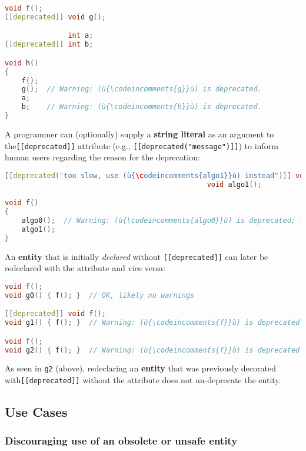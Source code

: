\begin{lstlisting}[language=C++]
               void f();
[[deprecated]] void g();

               int a;
[[deprecated]] int b;

void h()
{
    f();
    g();  // Warning: (ù{\codeincomments{g}}ù) is deprecated.
    a;
    b;    // Warning: (ù{\codeincomments{b}}ù) is deprecated.
}
\end{lstlisting}
    
\noindent A programmer can (optionally) supply a \textbf{string literal} as an
argument to the\linebreak[4] \mbox{\texttt{[[deprecated]]}} attribute (e.g.,
\mbox{\texttt{[[deprecated("message")]]}}) to inform human users regarding the
reason for the deprecation:

\begin{lstlisting}[language=C++]
[[deprecated("too slow, use (ù{\codeincomments{algo1}}ù) instead")]] void algo0();
                                                void algo1();

void f()
{
    algo0();  // Warning: (ù{\codeincomments{algo0}}ù) is deprecated; too slow, use (ù{\codeincomments{algo1}}ù) instead.
    algo1();
}
\end{lstlisting}
    
\noindent An \textbf{entity} that is initially \emph{declared} without
\texttt{[[deprecated]]} can later be redeclared with the attribute and
vice versa:

\begin{lstlisting}[language=C++]
void f();
void g0() { f(); }  // OK, likely no warnings

[[deprecated]] void f();
void g1() { f(); }  // Warning: (ù{\codeincomments{f}}ù) is deprecated.

void f();
void g2() { f(); }  // Warning: (ù{\codeincomments{f}}ù) is deprecated (still).
\end{lstlisting}
    
\noindent As seen in \texttt{g2} (above), redeclaring an \textbf{entity} that was
previously decorated with\linebreak[4] \mbox{\texttt{[[deprecated]]}} without the attribute
does not un-deprecate the entity.

\subsection[Use Cases]{Use Cases}\label{use-cases}

\subsubsection[Discouraging use of an obsolete or unsafe \textbf{entity}]{Discouraging use of an obsolete or unsafe \textbf{entity}}\label{discouraging-use-of-an-obsolete-or-unsafe-entity}

